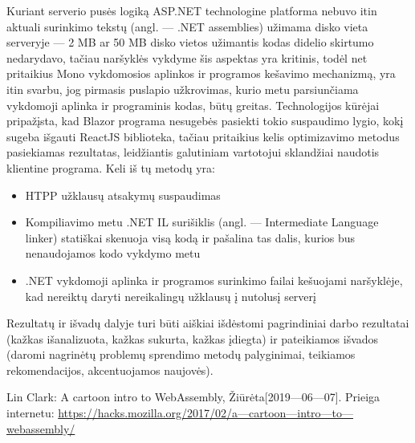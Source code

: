 \documentclass{VUMIFPSkursinis}
\begin{document}
Kuriant serverio pusės logiką ASP.NET technologine platforma nebuvo itin aktuali surinkimo tekstų (angl. — .NET assemblies) užimama disko vieta serveryje — 2 MB ar 50 MB disko vietos užimantis kodas didelio skirtumo nedarydavo, tačiau naršyklės vykdyme šis aspektas yra kritinis, todėl net pritaikius Mono vykdomosios aplinkos ir programos kešavimo mechanizmą, yra itin svarbu, jog pirmasis puslapio užkrovimas, kurio metu parsiunčiama vykdomoji aplinka ir programinis kodas, būtų greitas. Technologijos kūrėjai pripažįsta, kad Blazor programa nesugebės pasiekti tokio suspaudimo lygio, kokį sugeba išgauti ReactJS biblioteka, tačiau pritaikius kelis optimizavimo metodus pasiekiamas rezultatas, leidžiantis galutiniam vartotojui sklandžiai naudotis klientine programa. Keli iš tų metodų yra:
\begin{itemize}
    \item HTPP užklausų atsakymų suspaudimas
    \item Kompiliavimo metu .NET IL surišiklis (angl. — Intermediate Language linker) statiškai skenuoja visą kodą ir pašalina tas dalis, kurios bus nenaudojamos kodo vykdymo metu
    \item .NET vykdomoji aplinka ir programos surinkimo failai kešuojami naršyklėje, kad nereiktų daryti nereikalingų užklausų į nutolusį serverį
\end{itemize}

Rezultatų ir išvadų dalyje turi būti aiškiai išdėstomi pagrindiniai darbo
rezultatai (kažkas išanalizuota, kažkas sukurta, kažkas įdiegta) ir pateikiamos
išvados (daromi nagrinėtų problemų sprendimo metodų palyginimai, teikiamos
rekomendacijos, akcentuojamos naujovės).


\printbibliography[heading=bibintoc, title=Šaltiniai]  %
\begin{thebibliography}{99}

Lin Clark: A cartoon intro to WebAssembly, Žiūrėta[2019—06—07].  Prieiga internetu: \url{https://hacks.mozilla.org/2017/02/a—cartoon—intro—to—webassembly/}


\end{thebibliography}
\end{document}
